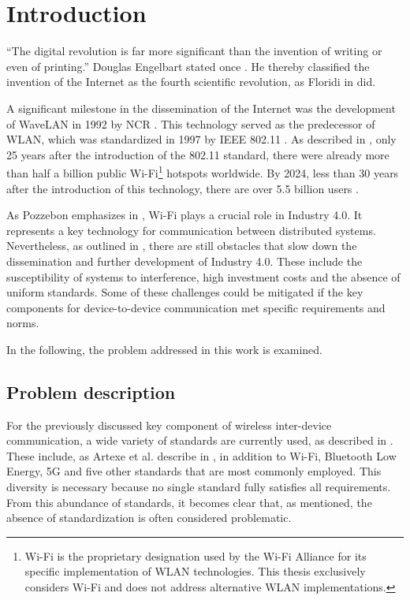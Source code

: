 \chapter{Introduction}
``The digital revolution is far more significant than the invention of writing or even of printing.'' Douglas Engelbart stated once \cite{forbes}. 
He thereby classified the invention of the Internet as the fourth scientific revolution, as Floridi in \cite{Floridi12052009} did.  

A significant milestone in the dissemination of the Internet was the development of WaveLAN in 1992 by NCR \cite{6771439}.  
This technology served as the predecessor of \ac{WLAN}, which was standardized in 1997 by IEEE 802.11 \cite{IEEE}.  
As described in \cite{statista}, only 25 years after the introduction of the 802.11 standard, there were already more than half a billion public Wi-Fi\footnote{Wi-Fi is the proprietary designation used by the Wi-Fi Alliance for its specific implementation of \ac{WLAN} technologies. This thesis exclusively considers Wi-Fi and does not address alternative \ac{WLAN} implementations.} hotspots worldwide.  
By 2024, less than 30 years after the introduction of this technology, there are over 5.5 billion users \cite{statista_all}.  

As Pozzebon emphasizes in \cite{telecom6020040}, Wi-Fi plays a crucial role in Industry 4.0.  
It represents a key technology for communication between distributed systems.  
Nevertheless, as outlined in \cite{statista_hem}, there are still obstacles that slow down the dissemination and further development of Industry 4.0.  
These include the susceptibility of systems to interference, high investment costs and the absence of uniform standards.  
Some of these challenges could be mitigated if the key components for device-to-device communication met specific requirements and norms.  

In the following, the problem addressed in this work is examined.

\section{Problem description} \label{subsec:problem}
For the previously discussed key component of wireless inter-device communication, a wide variety of standards are currently used, as described in \cite{industry4_standards}.  
These include, as Artexe et al. describe in \cite{industry4_standards}, in addition to Wi-Fi, Bluetooth Low Energy, 5G and five other standards that are most commonly employed.  
This diversity is necessary because no single standard fully satisfies all requirements.  
From this abundance of standards, it becomes clear that, as mentioned, the absence of standardization is often considered problematic.  

